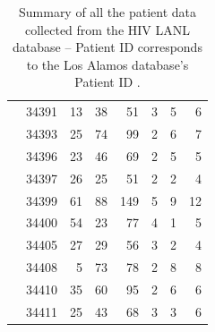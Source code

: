 \documentclass[12pt]{article}
\begin{document}
\begin{table}[!ht]
\begin{center}
\begin{tabular}{llrrrrrr}
& 34391 &     13 &       38 &       51 &        3 &        5 &        6  \\ 
& 34393 &     25 &       74 &       99 &        2 &        6 &        7  \\ 
& 34396 &      23 &       46 &       69 &        2 &        5 &        5 \\ 
& 34397 &      26 &       25 &       51 &        2 &        2 &        4  \\ 
& 34399 &      61 &       88 &      149 &        5 &        9 &       12  \\ 
& 34400 &      54 &       23 &       77 &        4 &        1 &        5  \\ 
& 34405 &      27 &       29 &       56 &        3 &        2 &        4  \\ 
& 34408 &       5 &       73 &       78 &        2 &        8 &        8 \\ 
& 34410 &      35 &       60 &       95 &        2 &        6 &        6 \\ 
& 34411 &      25 &       43 &       68 &        3 &        3 &        6   \\ \hline
\end{tabular}
\end{center}
  \caption{Summary of all the patient data collected from the HIV LANL database -- Patient ID corresponds to the Los Alamos database's Patient ID \citep{LosAlamos}.
   }\label{tab:patients} 
\end{table}
\end{document}
